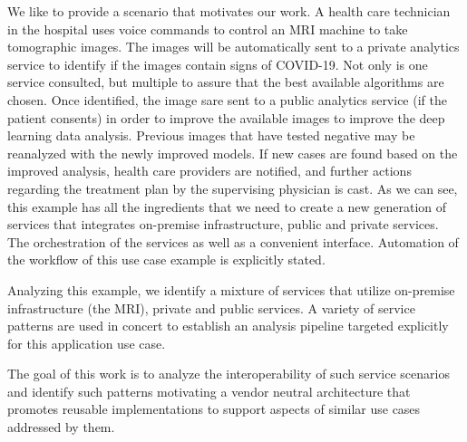 We like to provide a scenario that motivates our work. A health care
technician in the hospital uses voice commands to control an MRI
machine to take tomographic images. The images will be automatically
sent to a private analytics service to identify if the images contain
signs of COVID-19. Not only is one service consulted, but multiple to
assure that the best available algorithms are chosen. Once identified,
the image sare sent to a public analytics service (if the patient consents) in
order to improve the available images to improve the deep learning data
analysis. Previous images that have tested negative may be reanalyzed
with the newly improved models. If new cases are found based on
the improved analysis, health care providers are notified, and further
actions regarding the treatment plan by the supervising physician is
cast. As we can see, this example has all the ingredients that we need
to create a new generation of services that integrates on-premise
infrastructure, public and private services. The orchestration of the
services as well as a convenient interface. Automation of the workflow
of this use case example is explicitly stated.

Analyzing this example, we identify a mixture of services that utilize
on-premise infrastructure (the MRI), private and public services. A
variety of service patterns are used in concert to establish an analysis
pipeline targeted explicitly for this application use case. 

The goal of this work is to analyze the interoperability of such
service scenarios and identify such patterns motivating a vendor
neutral architecture that promotes reusable implementations to 
support aspects of similar use cases addressed by them.
